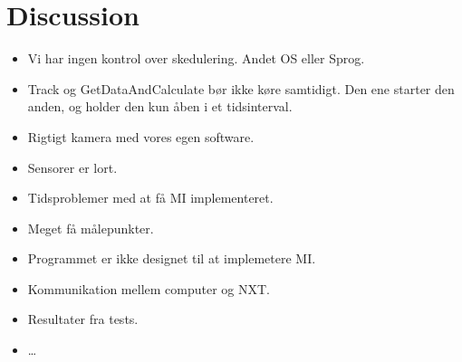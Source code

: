 \chapter{Discussion}
\begin{itemize}
  \item Vi har ingen kontrol over skedulering. Andet OS eller Sprog.
  \item Track og GetDataAndCalculate bør ikke køre samtidigt. Den ene starter
  den anden, og holder den kun åben i et tidsinterval.
  \item Rigtigt kamera med vores egen software.
  \item Sensorer er lort.
  \item Tidsproblemer med at få MI implementeret.
  \item Meget få målepunkter.
  \item Programmet er ikke designet til at implemetere MI.
  \item Kommunikation mellem computer og NXT.
  \item Resultater fra tests.
  \item \ldots
\end{itemize}